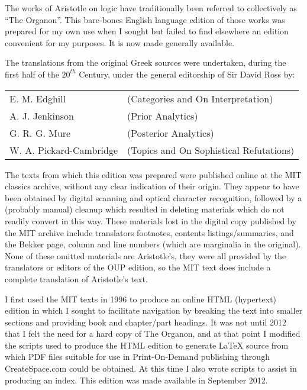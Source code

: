 The works of Aristotle on logic have traditionally been referred to collectively as ``The Organon''. 
This bare-bones English language edition of those works was prepared for my own use when I sought but failed to find elsewhere an edition convenient for my purposes.
It is now made generally available.
 
The translations from the original Greek sources were undertaken, during the first half of the \ensuremath{20^{th}} Century, under the general editorship of Sir David Ross by:

\vspace{0.2in}

\begin{centering}
\begin{tabular}{l l}
E. M. Edghill & (Categories and On Interpretation)\\
A. J. Jenkinson & (Prior Analytics)\\
G. R. G. Mure & (Posterior Analytics)\\
W. A. Pickard-Cambridge & (Topics and On Sophistical Refutations)
\end{tabular}
\end{centering}

\vspace{0.2in}

The texts from which this edition was prepared were published online at the MIT classics archive, without any clear indication of their origin.
They appear to have been obtained by digital scanning and optical character recognition, followed by a (probably manual) cleanup which resulted in deleting materials which do not readily convert in this way.
These materials lost in the digital copy published by the MIT archive include translators footnotes, contents listings/summaries, and the Bekker page, column and line numbers (which are marginalia in the original).
None of these omitted materials are Aristotle's, they were all provided by the translators or editors of the OUP edition, so the MIT text does include a complete translation of Aristotle's text.

I first used the MIT texts in 1996 to produce an online HTML (hypertext) edition in which I sought to facilitate navigation by breaking the text into smaller sections and providing book and chapter/part headings.
It was not until 2012 that I felt the need for a hard copy of The Organon, and at that point I modified the scripts used to produce the HTML edition to generate {\LaTeX} source from which PDF files suitable for use in Print-On-Demand publishing through CreateSpace.com could be obtained.
At this time I also wrote scripts to assist in producing an index.
This edition was made available in September 2012.


